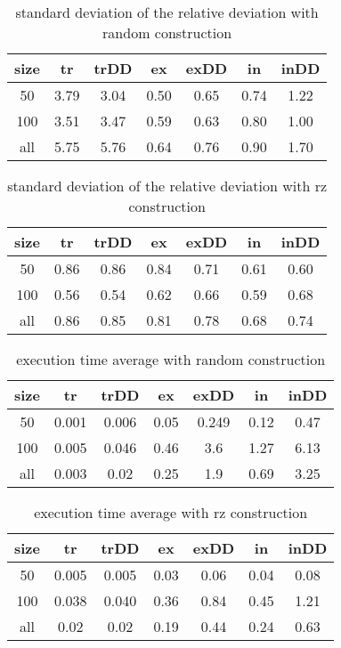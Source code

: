 \documentclass[12pt,a4paper]{article}
\begin{document}
\begin{table}[!h]
\centering
\begin{tabular}{|*{7}{c|}}
  \hline
  size & tr & trDD & ex & exDD & in & inDD \\
  \hline
  50 & 3.79 & 3.04 & 0.50 & 0.65 & 0.74 & 1.22 \\ %
  100 & 3.51 & 3.47 & 0.59 & 0.63 & 0.80 & 1.00 \\ %
  all & 5.75 & 5.76 & 0.64 & 0.76 & 0.90 & 1.70 \\ %
  \hline
\end{tabular}
\caption{standard deviation of the relative deviation with random construction}
\label{standard deviation of the relative deviation with random construction}
\end{table}


\begin{table}[!h]
\centering
\begin{tabular}{|*{7}{c|}}
  \hline
  size & tr & trDD & ex & exDD & in & inDD \\
  \hline
  50 & 0.86 & 0.86 & 0.84 & 0.71 & 0.61 & 0.60 \\ %
  100 & 0.56 & 0.54 & 0.62 & 0.66 & 0.59 & 0.68 \\ %
  all & 0.86 & 0.85 & 0.81 & 0.78 & 0.68 & 0.74 \\ %
  \hline
\end{tabular}
\caption{standard deviation of the relative deviation with rz construction}
\label{standard deviation of the relative deviation with rz construction}
\end{table}


\begin{table}[!h]
\centering
\begin{tabular}{|*{7}{c|}}
  \hline
  size & tr & trDD & ex & exDD & in & inDD \\
  \hline
  50 & 0.001 & 0.006 & 0.05 & 0.249 & 0.12 & 0.47 \\ %
  100 & 0.005 & 0.046 & 0.46 & 3.6 & 1.27 & 6.13 \\ %
  all & 0.003 & 0.02 & 0.25 & 1.9 & 0.69 & 3.25 \\ %
  \hline
\end{tabular}
\caption{execution time average with random construction}
\label{Execution time with random construction}
\end{table}

\begin{table}[!h]
\centering
\begin{tabular}{|*{7}{c|}}
  \hline
  size & tr & trDD & ex & exDD & in & inDD \\
  \hline
  50 & 0.005 & 0.005 & 0.03 & 0.06 & 0.04 & 0.08 \\ %
  100 & 0.038 & 0.040 & 0.36 & 0.84 & 0.45 & 1.21 \\ %
  all & 0.02 & 0.02 & 0.19 & 0.44 & 0.24 & 0.63 \\ %
  \hline
\end{tabular}
\caption{execution time average with rz construction}
\label{Execution time with rz construction}
\end{table}
\end{document}
